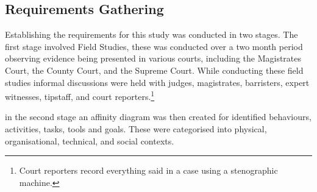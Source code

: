 \subsection{Requirements Gathering}
Establishing the requirements for this study was conducted in two stages. The first stage involved Field Studies, these was conducted over a two month period observing evidence being presented in various courts, including the Magistrates Court, the County Court, and the Supreme Court. While conducting these field studies informal discussions were held with judges, magistrates, barristers, expert witnesses, tipstaff, and court reporters.\footnote{Court reporters record everything said in a case using a stenographic machine.  }

in the second stage an affinity diagram was then created for identified behaviours, activities, tasks, tools and goals. These were categorised into physical, organisational, technical, and social contexts.


